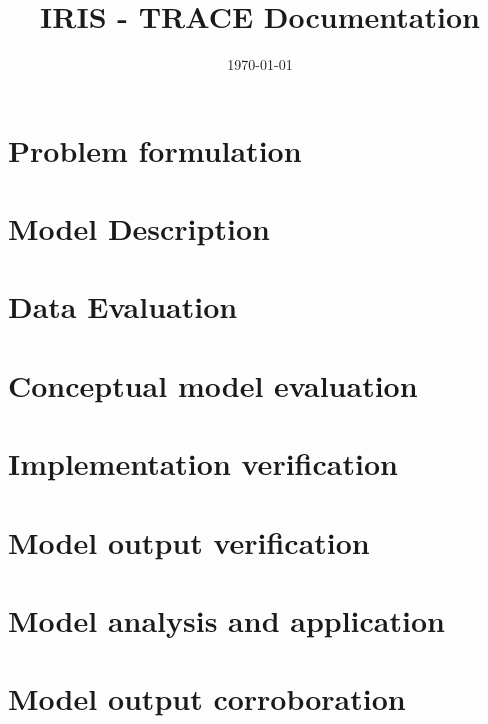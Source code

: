 \documentclass[a4paper, 11pt]{scrartcl}
\title{IRIS - TRACE Documentation}
\author{}
\date{\today}
\begin{document}
\maketitle
\tableofcontents

\section{Problem formulation}

\section{Model Description}

\section{Data Evaluation}

\section{Conceptual model evaluation}

\section{Implementation verification}

\section{Model output verification}

\section{Model analysis and application}

\section{Model output corroboration}
\end{document}
